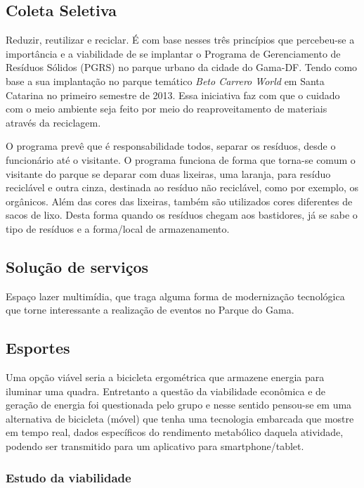 \subsection{Coleta Seletiva}

Reduzir, reutilizar e reciclar. \'E com base nesses tr\^es princ\'ipios que percebeu-se a import\^ancia e a viabilidade de se implantar o Programa de Gerenciamento de Res\'iduos S\'olidos (PGRS) no parque urbano da cidade do Gama-DF. Tendo como base a sua implanta\c{c}\~ao no parque tem\'atico \textit{Beto Carrero World} em Santa Catarina no primeiro semestre de 2013. Essa iniciativa faz com que o cuidado com o meio ambiente seja feito por meio do reaproveitamento de materiais atrav\'es da reciclagem.

	O programa prev\^e que \'e responsabilidade todos, separar os res\'iduos, desde o funcion\'ario at\'e o visitante. O programa funciona de forma que torna-se comum o visitante do parque se deparar com duas lixeiras, uma laranja, para res\'iduo recicl\'avel e outra cinza, destinada ao res\'iduo n\~ao recicl\'avel, como por exemplo, os org\^anicos. Al\'em das cores das lixeiras, tamb\'em s\~ao utilizados cores diferentes de sacos de lixo. Desta forma quando os res\'iduos chegam aos bastidores, j\'a se sabe o tipo de res\'iduos e a forma/local de armazenamento.


\subsection{Solu\c{c}\~ao de servi\c{c}os}

Espa\c{c}o lazer multim\'idia, que traga alguma forma de moderniza\c{c}\~ao tecnol\'ogica que torne interessante a realiza\c{c}\~ao de eventos no Parque do Gama.

\subsection{Esportes}

Uma op\c{c}\~ao vi\'avel seria a bicicleta ergom\'etrica que armazene energia para iluminar uma quadra. Entretanto a quest\~ao da viabilidade econ\^omica e de gera\c{c}\~ao de energia foi questionada pelo grupo e nesse sentido pensou-se em uma alternativa de bicicleta (m\'ovel) que tenha uma tecnologia embarcada que mostre em tempo real, dados espec\'ificos do rendimento metab\'olico daquela atividade, podendo ser transmitido para um aplicativo para smartphone/tablet.

\subsubsection{Estudo da viabilidade}

